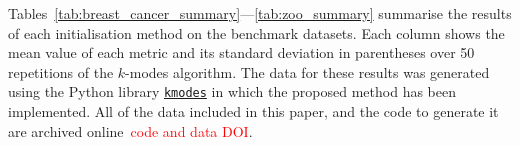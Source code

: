 Tables~\ref{tab:breast_cancer_summary}---\ref{tab:zoo_summary} summarise the
results of each initialisation method on the benchmark datasets. Each column
shows the mean value of each metric and its standard deviation in parentheses
over 50 repetitions of the \(k\)-modes algorithm. The data for these results
was generated using the Python library
\href{https://github.com/nicodv/kmodes}{\texttt{kmodes}} in which the proposed
method has been implemented. All of the data included in this paper, and the
code to generate it are archived online~\textcolor{red}{code and data DOI}.

%
%

